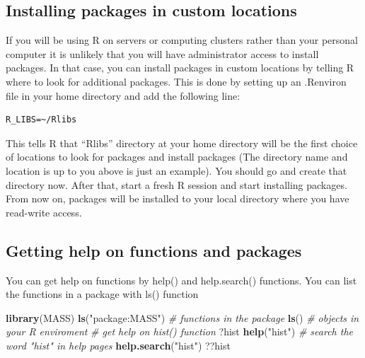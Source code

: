 \documentclass[12pt,]{krantz}
\newenvironment{Shaded}{\begin{snugshade}}{\end{snugshade}}
\newcommand{\CommentTok}[1]{\textcolor[rgb]{0.56,0.35,0.01}{\textit{#1}}}
\newcommand{\KeywordTok}[1]{\textcolor[rgb]{0.13,0.29,0.53}{\textbf{#1}}}
\newcommand{\NormalTok}[1]{#1}
\newcommand{\StringTok}[1]{\textcolor[rgb]{0.31,0.60,0.02}{#1}}
\begin{document}
\hypertarget{installing-packages-in-custom-locations}{%
\subsection{Installing packages in custom locations}\label{installing-packages-in-custom-locations}}

If you will be using R on servers or computing clusters rather than your personal computer it is unlikely that you will have administrator access to install packages. In that case, you can install packages in custom locations by telling R where to look for additional packages. This is done by setting up an .Renviron file in your home directory and add the following line:

\begin{verbatim}
R_LIBS=~/Rlibs
\end{verbatim}

This tells R that ``Rlibs'' directory at your home directory will be the first choice of locations to look for packages and install packages (The directory name and location is up to you above is just an example). You should go and create that directory now. After that, start a fresh R session and start installing packages. From now on, packages will be installed to your local directory where you have read-write access.

\hypertarget{getting-help-on-functions-and-packages}{%
\subsection{Getting help on functions and packages}\label{getting-help-on-functions-and-packages}}

You can get help on functions by help() and help.search() functions. You can list the functions in a package with ls() function

\begin{Shaded}
\begin{Highlighting}[]
\KeywordTok{library}\NormalTok{(MASS)}
\KeywordTok{ls}\NormalTok{(}\StringTok{"package:MASS"}\NormalTok{) }\CommentTok{# functions in the package}
\KeywordTok{ls}\NormalTok{() }\CommentTok{# objects in your R enviroment}
\CommentTok{# get help on hist() function}
\NormalTok{?hist}
\KeywordTok{help}\NormalTok{(}\StringTok{"hist"}\NormalTok{)}
\CommentTok{# search the word "hist" in help pages}
\KeywordTok{help.search}\NormalTok{(}\StringTok{"hist"}\NormalTok{)}
\NormalTok{??hist}
\end{Highlighting}
\end{Shaded}
\end{document}
